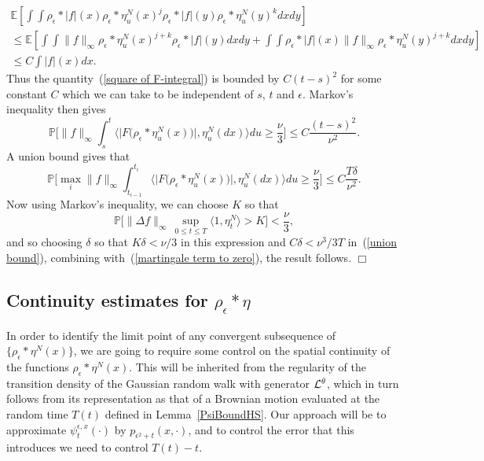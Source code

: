 \documentclass[12pt]{article}
\newenvironment {proof}{{\noindent\bf Proof }}{\hfill $\Box$ \medskip}
\newcommand{\IP}{\mathbb P}
\newcommand{\IE}{\mathbb E}
\numberwithin{equation}{section}
\begin{document}
\begin{proof}
\begin{multline*}
	\IE\left[	\int\int\rho_\epsilon*|f|(x)\rho_\epsilon*\eta_u^N(x)^j
	\rho_\epsilon*|f|(y)\rho_\epsilon*\eta_u^N(y)^k dx dy\right]
	\\
	\leq
	\IE\left[\int\int\|f\|_\infty\rho_\epsilon*\eta_u^N(x)^{j+k}
	\rho_\epsilon*|f|(y)
	dx dy
+
	\int\int
	\rho_\epsilon*|f|(x)
	\|f\|_\infty
	\rho_\epsilon*\eta_u^N(y)^{j+k}
	dx dy \right]
	\\ \leq C\int |f|(x)dx.
\end{multline*}
Thus the quantity~(\ref{square of F-integral}) 
is bounded by $C(t-s)^2$ for some constant $C$ which we can 
take to be independent of $s$, $t$ and $\epsilon$. Markov's inequality 
then gives
\[
\IP\Big[\|f\|_\infty\int_s^t
\big\langle \big|F\big(\rho_\epsilon*\eta_u^N(x)\big)\big|,
\eta_u^N(dx)\big\rangle du \geq \frac{\nu}{3}\Big]
\leq C\frac{(t-s)^2}{\nu^2}.
\]
A union bound gives that
\begin{equation}
\label{union bound}
\IP\Big[\max_i\|f\|_\infty\int_{t_{i-1}}^{t_i}
\big\langle \big|F\big(\rho_\epsilon*\eta_u^N(x)\big)\big|,
\eta_u^N(dx)\big\rangle du \geq \frac{\nu}{3}\Big]
\leq C\frac{T\delta}{\nu^2}.
\end{equation}
Now using Markov's inequality, we can choose $K$ so that
\[
\IP\Big[\|\Delta f\|_\infty\, \sup_{0\leq t\leq T} \langle 1,\eta_t^N\rangle 
>K\Big]<\frac{\nu}{3}, 
\]
and so choosing $\delta$ so that $K\delta<\nu/3$ in this 
expression and $C\delta<\nu^3/3T$ in~(\ref{union bound}),
combining with~(\ref{martingale term to zero}), the result follows.
\end{proof}

\subsection{Continuity estimates for $\rho_\epsilon*\eta$}
\label{continuity for random walk}

In order to identify the limit point of any convergent subsequence
of $\{\rho_\epsilon*\eta^N(x)\}$, 
we are going to require some control on the spatial continuity of the 
functions $\rho_\epsilon*\eta^N(x)$. This will be inherited from the regularity
of the transition density of the 
Gaussian random walk with generator ${\cal L}^\theta$, which in turn follows
from its representation
as that of a Brownian motion evaluated at the random time $T(t)$ defined
in Lemma~\ref{PsiBoundHS}.
Our approach will be to 
approximate $\psi_t^{\epsilon,x}(\cdot)$ by $p_{\epsilon^2+t}(x, \cdot)$,
and to control the error that this introduces we 
need to control $T(t)-t$. 
\end{document}
